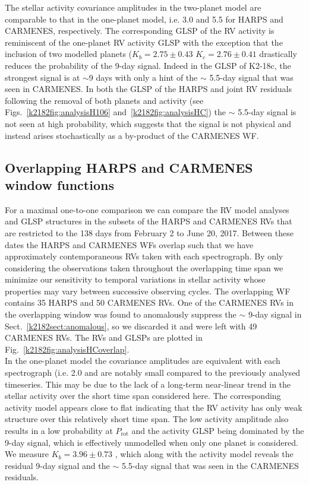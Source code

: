 The stellar activity covariance amplitudes in the two-planet model are comparable to that in the one-planet model, i.e.
3.0 and 5.5 \mps{} for HARPS and CARMENES, respectively.
The corresponding GLSP of the RV activity is reminiscent of the one-planet RV activity GLSP with the exception
that the inclusion of two modelled planets ($K_b=2.75\pm 0.43$ \mps{,} $K_c=2.76\pm 0.41$ \mps{)} 
drastically reduces the probability of the 9-day signal.
Indeed in the GLSP of K2-18c, the strongest signal is at $\sim 9$ days with only a hint of the $\sim$ 5.5-day signal that was seen in CARMENES.
In both the GLSP of the HARPS and joint RV residuals following the removal of both planets and
activity (see Figs.~\ref{k2182fig:analysisH106} and~\ref{k2182fig:analysisHC})
the $\sim$ 5.5-day signal is not seen at high probability, which suggests that the signal is not physical
and instead arises stochastically as a by-product of the CARMENES WF.


\subsection{Overlapping HARPS and CARMENES window functions}
For a maximal one-to-one comparison we can compare the RV model analyses and GLSP structures
in the subsets of the HARPS and CARMENES RVs that are restricted to the 138 days from February 2 to
June 20, 2017. Between these dates the HARPS and CARMENES WFs overlap such that we
have approximately contemporaneous RVs taken with each spectrograph. By only considering
the observations taken throughout the overlapping time span we minimize our sensitivity to temporal
variations in stellar activity whose properties may vary between successive observing cycles. The overlapping
WF contains 35 HARPS and 50 CARMENES RVs. One of the CARMENES RVs in the overlapping window
was found to anomalously suppress the $\sim$ 9-day signal in Sect.~\ref{k2182sect:anomalous}, so we discarded it and
were left with 49 CARMENES RVs. The RVs and GLSPs are plotted in Fig.~\ref{k2182fig:analysisHCoverlap}. \\

In the one-planet model the covariance amplitudes are equivalent with
each spectrograph (i.e. 2.0 \mps{)} and are notably small compared to the previously
analysed timeseries. This may be due to the lack of a long-term near-linear trend in the stellar activity
over the short time span considered here.
The corresponding activity model appears close to flat indicating that the RV activity
has only weak structure over this relatively short time span. The low activity amplitude also results in
a low probability at $P_{\text{rot}}$ and the activity GLSP being dominated by the 9-day signal, which is effectively
unmodelled when only one planet is considered.
We measure $K_b=3.96\pm 0.73$ \mps{}, which along with the activity model reveals the residual 9-day signal
and the $\sim$ 5.5-day signal that was seen in the CARMENES residuals. \\

